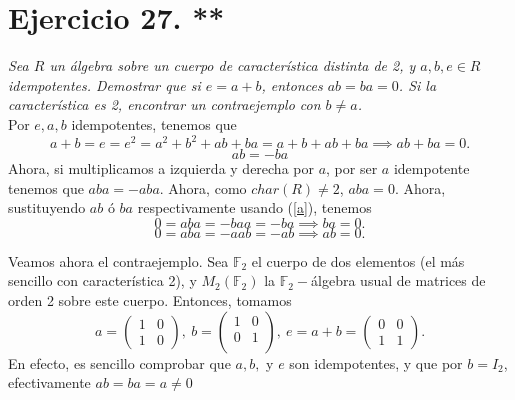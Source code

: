\section{Ejercicio 27. **}  \textit{Sea $R$ un álgebra sobre un cuerpo de característica distinta de 2, y $a,b,e \in R$ idempotentes. Demostrar que si $e = a + b$, entonces  $ab = ba = 0$. Si la característica es 2, encontrar un contraejemplo con  $b \neq a$.}\\

Por $e, a, b$ idempotentes, tenemos que
\[
    a + b = e = e^2 = a^2 + b^2 + ab + ba = a + b + ab + ba \implies ab + ba = 0
.\]
\begin{equation}\label{a}
    ab = -ba
\end{equation}
Ahora, si multiplicamos a izquierda y derecha por $a$, por ser $a$ idempotente tenemos que $aba = -aba$. Ahora, como $char(R) \neq 2$, $aba = 0$. Ahora, sustituyendo $ab$ ó $ba$ respectivamente usando (\ref{a}), tenemos
\[
    0 = aba = -baa = -ba \implies ba = 0
.\]
\[
    0 = aba = -aab = -ab \implies ab = 0
.\]

Veamos ahora el contraejemplo. Sea $\mathbb{F}_2$ el cuerpo de dos elementos (el más sencillo con característica 2), y $M_2(\mathbb{F}_2)$ la $\mathbb{F}_2-$álgebra usual de matrices de orden 2 sobre este cuerpo. Entonces, tomamos
\[
a =
\begin{pmatrix}
    1 & 0 \\
    1 & 0
\end{pmatrix}, \
b =
\begin{pmatrix}
    1 & 0 \\
    0 & 1 \\
\end{pmatrix}, \
e = a + b =
\begin{pmatrix}
    0 & 0 \\
    1 & 1
\end{pmatrix}
.\]
En efecto, es sencillo comprobar que $a, b,$ y $e$ son idempotentes, y que por $b = I_2$, efectivamente $ab = ba = a \neq 0$
